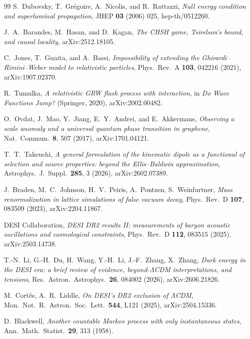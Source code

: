 \documentclass[11pt]{article}
\theoremstyle{definition}
\theoremstyle{remark}
\begin{document}
\begin{thebibliography}{99}
S.~Dubovsky, T.~Gr\'egoire, A.~Nicolis, and R.~Rattazzi,
\emph{Null energy condition and superluminal propagation},
JHEP \textbf{03} (2006) 025, hep-th/0512260.

J.~A.~Barandes, M.~Hasan, and D.~Kagan,
\emph{The CHSH game, Tsirelson's bound, and causal locality},
arXiv:2512.18105.

C.~Jones, T.~Guaita, and A.~Bassi,
\emph{Impossibility of extending the Ghirardi--Rimini--Weber model
to relativistic particles},
Phys.\ Rev.\ A \textbf{103}, 042216 (2021), arXiv:1907.02370.

R.~Tumulka,
\emph{A relativistic GRW flash process with interaction},
in \emph{Do Wave Functions Jump?} (Springer, 2020),
arXiv:2002.00482.

O.~Ovdat, J.~Mao, Y.~Jiang, E.~Y.~Andrei, and E.~Akkermans,
\emph{Observing a scale anomaly and a universal quantum phase
transition in graphene},
Nat.\ Commun.\ \textbf{8}, 507 (2017), arXiv:1701.04121.

T.~T.~Takeuchi,
\emph{A general formulation of the kinematic dipole as a functional
of selection and source properties: beyond the Ellis--Baldwin
approximation},
Astrophys.\ J.\ Suppl.\ \textbf{285}, 3 (2026), arXiv:2602.07389.

J.~Braden, M.~C.~Johnson, H.~V.~Peiris, A.~Pontzen, S.~Weinfurtner,
\emph{Mass renormalization in lattice simulations of false vacuum
decay},
Phys.\ Rev.\ D \textbf{107}, 083509 (2023), arXiv:2204.11867.

DESI Collaboration,
\emph{DESI DR2 results II: measurements of baryon acoustic
oscillations and cosmological constraints},
Phys.\ Rev.\ D \textbf{112}, 083515 (2025), arXiv:2503.14738.

T.-N.~Li, G.-H.~Du, H.~Wang, Y.-H.~Li, J.-F.~Zhang, X.~Zhang,
\emph{Dark energy in the DESI era: a brief review of evidence,
beyond-$\Lambda$CDM interpretations, and tensions},
Res.\ Astron.\ Astrophys.\ \textbf{26}, 084002 (2026), arXiv:2606.21826.

M.~Cort\^es, A.~R.~Liddle,
\emph{On DESI's DR2 exclusion of $\Lambda$CDM},
Mon.\ Not.\ R.\ Astron.\ Soc.\ Lett.\ \textbf{544}, L121 (2025), arXiv:2504.15336.

D.~Blackwell,
\emph{Another countable Markov process with only instantaneous
states},
Ann.\ Math.\ Statist.\ \textbf{29}, 313 (1958).


\end{thebibliography}
\end{document}
